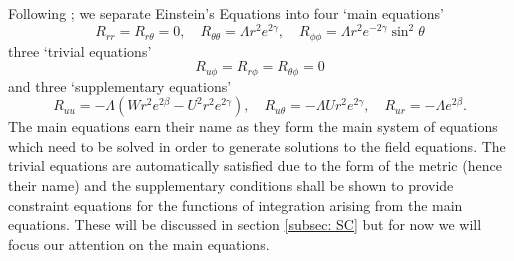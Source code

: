 \documentclass[a4paper,11pt]{article}
\numberwithin{equation}{section}
\begin{document}
Following \cite{Bondi:1962px}; we separate Einstein's Equations into four `main equations'
\begin{equation} \label{eq:2.3}
R_{rr}=R_{r\theta}=0, \quad R_{\theta \theta}=\Lambda r^2e^{2 \gamma}, \quad R_{\phi \phi}=\Lambda r^2e^{-2\gamma}\sin^2\theta 
\end{equation}
\noindent three `trivial equations' 
\begin{equation}
R_{u \phi}=R_{r \phi}=R_{\theta \phi}=0
\end{equation}
\noindent and three `supplementary equations'
\begin{equation}
R_{uu}=-\Lambda(Wr^2e^{2\beta}-U^2r^2e^{2\gamma}) , \quad R_{u\theta}=-\Lambda Ur^2e^{2\gamma}, \quad R_{u r}=-\Lambda e^{2\beta}.
\end{equation}
The main equations earn their name as they form the main system of equations which need to be solved in order to generate solutions to the field equations. The trivial equations are automatically satisfied due to the form of the metric (hence their name) and the supplementary conditions shall be shown to provide constraint equations for the functions of integration arising from the main equations. These will be discussed in section \ref{subsec: SC} but for now we will focus our attention on the main equations. 
\end{document}
